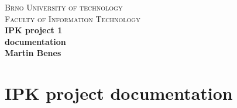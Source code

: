 \documentclass[10pt,a4paper,titlepage]{article}
\begin{document}
\begin{titlepage}

\begin{center}
\textsc{\LARGE Brno University of technology}\\[0.5cm]
\textsc{\large Faculty of Information Technology}\\[8cm]

{ \huge \bfseries IPK project 1}\\[0.3cm]
{ \Large \bfseries documentation}\\[0.5cm]
{ \bfseries Martin Benes}\\

\end{center}

\end{titlepage}
\newpage


\setcounter{page}{1}

\section{IPK project documentation}
\end{document}
